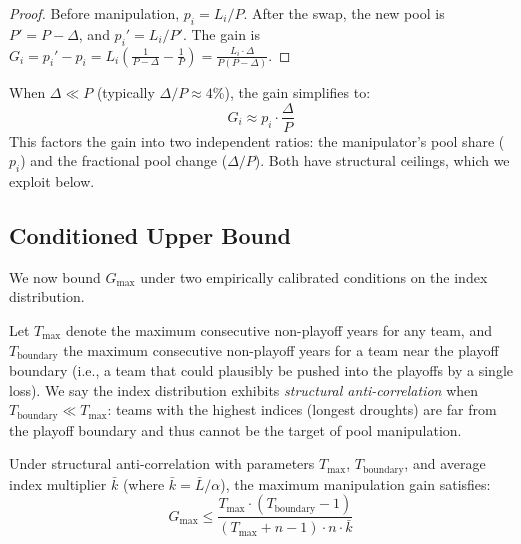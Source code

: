 \begin{proof}
Before manipulation, $p_i = L_i / P$. After the swap, the new pool is $P' = P - \Delta$, and $p_i' = L_i / P'$. The gain is $G_i = p_i' - p_i = L_i \left(\frac{1}{P - \Delta} - \frac{1}{P}\right) = \frac{L_i \cdot \Delta}{P(P - \Delta)}$.
\end{proof}

\begin{remark}
When $\Delta \ll P$ (typically $\Delta/P \approx 4\%$), the gain simplifies to:
\begin{equation}
\label{eq:approx}
G_i \approx p_i \cdot \frac{\Delta}{P}
\end{equation}
This factors the gain into two independent ratios: the manipulator's pool share ($p_i$) and the fractional pool change ($\Delta/P$). Both have structural ceilings, which we exploit below.
\end{remark}

\subsection{Conditioned Upper Bound}

We now bound $G_{\max}$ under two empirically calibrated conditions on the index distribution.

\begin{definition}
\label{def:anticorr}
Let $T_{\max}$ denote the maximum consecutive non-playoff years for any team, and $T_{\text{boundary}}$ the maximum consecutive non-playoff years for a team near the playoff boundary (i.e., a team that could plausibly be pushed into the playoffs by a single loss). We say the index distribution exhibits \emph{structural anti-correlation} when $T_{\text{boundary}} \ll T_{\max}$: teams with the highest indices (longest droughts) are far from the playoff boundary and thus cannot be the target of pool manipulation.
\end{definition}

\begin{theorem}
\label{thm:bound}
Under structural anti-correlation with parameters $T_{\max}$, $T_{\text{boundary}}$, and average index multiplier $\bar{k}$ (where $\bar{k} = \bar{L} / \alpha$), the maximum manipulation gain satisfies:
\begin{equation}
\label{eq:bound}
G_{\max} \leq \frac{T_{\max} \cdot (T_{\text{boundary}} - 1)}{(T_{\max} + n - 1) \cdot n \cdot \bar{k}}
\end{equation}
\end{theorem}

